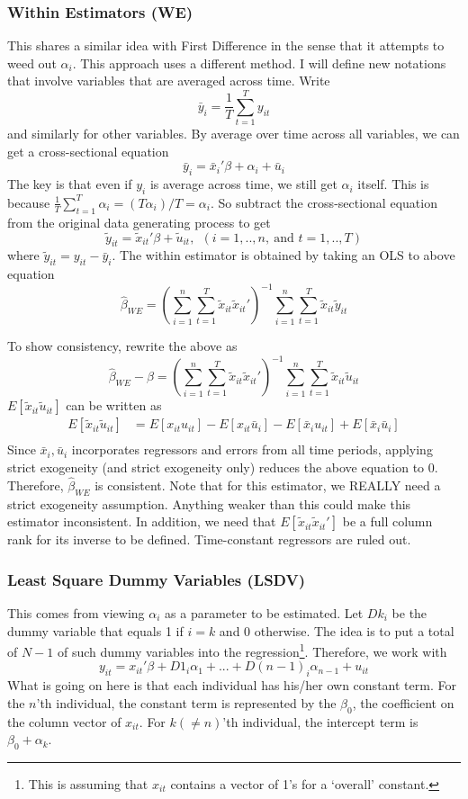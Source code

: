 \documentclass[12pt]{article}
\theoremstyle{definition}
\theoremstyle{property}
\theoremstyle{assumption}
\theoremstyle{example}
\theoremstyle{comment}
\begin{document}
\subsubsection{Within Estimators (WE)}
This shares a similar idea with First Difference in the sense that it attempts to weed out $\alpha_i$. This approach uses a different method. I will define new notations that involve variables that are averaged across time. Write 
\[
\bar{y}_i =\frac{1}{T}\sum_{t=1}^T y_{it}
\]
and similarly for other variables. By average over time across all variables, we can get a cross-sectional equation
\[
\bar{y}_i = \bar{x}_i'\beta + \alpha_i+\bar{u}_i
\]
The key is that even if $y_i$ is average across time, we still get $\alpha_i$ itself. This is because $\frac{1}{T}\sum_{t=1}^T\alpha_i = (T\alpha_i)/T=\alpha_i$. So subtract the cross-sectional equation from the original data generating process to get
\[
\tilde{y}_{it}= \tilde{x}_{it}'\beta+\tilde{u}_{it}, \ \ (i=1,..,n, \ \text{and } t=1,..,T)
\]
where $\tilde{y}_{it}=y_{it}-\bar{y}_i$. The within estimator is obtained by taking an OLS to above equation
\[
\hat{\beta}_{WE}=\left(\sum_{i=1}^n\sum_{t=1}^T \tilde{x}_{it}\tilde{x}_{it}'\right)^{-1}\sum_{i=1}^n\sum_{t=1}^T \tilde{x}_{it}\tilde{y}_{it}
\]
\par
To show consistency, rewrite the above as
\[
\hat{\beta}_{WE}-\beta=\left(\sum_{i=1}^n\sum_{t=1}^T \tilde{x}_{it}\tilde{x}_{it}'\right)^{-1}\sum_{i=1}^n\sum_{t=1}^T \tilde{x}_{it}\tilde{u}_{it}
\]
$E[\tilde{x}_{it}\tilde{u}_{it}]$ can be written as
\[
\begin{aligned}
E[\tilde{x}_{it}\tilde{u}_{it}]&=E[x_{it}u_{it}]-E[x_{it}\bar{u}_i]-E[\bar{x}_iu_{it}]+E[\bar{x}_i\bar{u}_i]\\
\end{aligned}
\] Since $\bar{x}_i, \bar{u}_i$ incorporates regressors and errors from all time periods, applying strict exogeneity (and strict exogeneity only) reduces the above equation to 0. Therefore, $\hat{\beta}_{WE}$ is consistent. Note that for this estimator, we REALLY need a strict exogeneity assumption. Anything weaker than this could make this estimator inconsistent. In addition, we need that $E\left[\tilde{x}_{it}\tilde{x}_{it}'\right]$ be a full column rank for its inverse to be defined. Time-constant regressors are ruled out. \par
\subsubsection{Least Square Dummy Variables (LSDV)}
This comes from viewing $\alpha_i$ as a parameter to be estimated. Let $Dk_i$ be the dummy variable that equals 1 if $i=k$ and 0 otherwise. The idea is to put a total of $N-1$ of such dummy variables into the regression\footnote{This is assuming that $x_{it}$ contains a vector of 1's for a `overall' constant.}. Therefore, we work with
\small{\[
y_{it}=x_{it}'\beta + D1_i\alpha_1+...+D(n-1)_i\alpha_{n-1}+u_{it} 
\]}\normalsize
What is going on here is that each individual has his/her own constant term. For the $n$'th individual, the constant term is represented by the $\beta_0$, the coefficient on the column vector of $x_{it}$. For $k(\neq n)$'th individual, the intercept term is $\beta_0 + \alpha_k$. 
\end{document}

